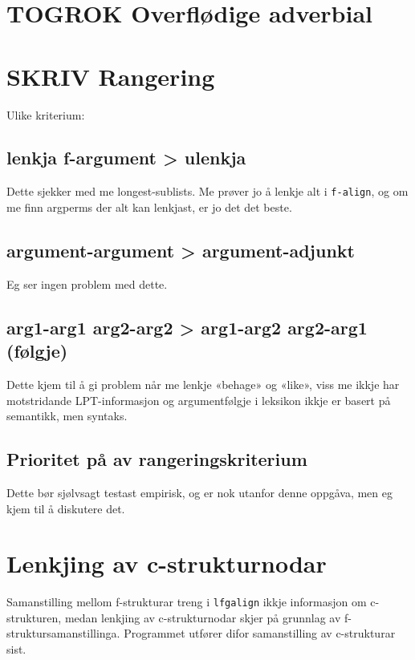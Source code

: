 \documentclass[11pt,a4paper,oneside,draft]{book}
\begin{document}
\section{\textbf{TOGROK} Overflødige adverbial}
\label{sec-4.3}

\section{\textbf{SKRIV} Rangering}
\label{sec-4.4}

\label{SEC:f-rangering}
   Ulike kriterium:
\subsection{lenkja f-argument > ulenkja}
\label{sec-4.4.1}

    Dette sjekker med me longest-sublists. Me prøver jo å lenkje alt i
    \texttt{f-align}, og om me finn argperms der alt kan lenkjast, er jo det
    det beste.
\subsection{argument-argument > argument-adjunkt}
\label{sec-4.4.2}

    Eg ser ingen problem med dette.
\subsection{arg1-arg1 arg2-arg2 > arg1-arg2 arg2-arg1 (følgje)}
\label{sec-4.4.3}

    Dette kjem til å gi problem når me lenkje «behage» og «like», viss
    me ikkje har motstridande LPT-informasjon og argumentfølgje i
    leksikon ikkje er basert på semantikk, men syntaks.
\subsection{Prioritet på av rangeringskriterium}
\label{sec-4.4.4}

    Dette bør sjølvsagt testast empirisk, og er nok utanfor denne
    oppgåva, men eg kjem til å diskutere det.
\section{Lenkjing av c-strukturnodar}
\label{sec-4.5}

Samanstilling mellom f-strukturar treng i \texttt{lfgalign} ikkje informasjon
om c-strukturen, medan lenkjing av c-strukturnodar skjer på grunnlag
av f-struktursamanstillinga. Programmet utfører difor samanstilling av
c-strukturar sist.
\end{document}
